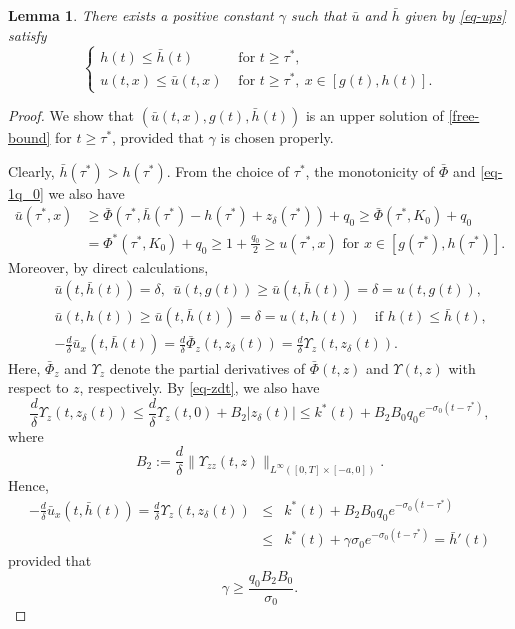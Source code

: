 \documentclass[11pt]{amsart}
\newtheorem{lemma}[theorem]{Lemma}
\numberwithin{equation}{section}
\begin{document}
\begin{lemma}\label{lemma-upp}
There exists a positive constant $\gamma$ such that $\bar{u}$ and $\bar{h}$  given by \eqref{eq-ups} satisfy
\begin{equation*}
  \begin{cases}
    h(t)\leq \bar{h}(t) &\text{ for }t\geq \tau^*,\\
u(t,x)\leq \bar{u}(t,x) &\text{ for }t\geq\tau^*, ~x\in[g(t),h(t)].
  \end{cases}
\end{equation*}
\end{lemma}
\begin{proof}  We  show that $(\bar{u}(t,x),g(t),\bar{h}(t))$ is an upper solution of \eqref{free-bound} for $t\geq \tau^*$, provided that $\gamma$ is chosen properly.  

  Clearly,  $\bar{h}(\tau^*)>h(\tau^*)$. From the choice of $\tau^*$, the monotonicity of $\bar{\Phi}$ and \eqref{eq-1q_0} we also have 
\begin{align*}
  \bar{u}(\tau^*,x)&\geq  \bar{\Phi}(\tau^*, \bar{h}(\tau^*)-h(\tau^*)+z_\delta(\tau^*))+q_0\geq  \bar{\Phi}(\tau^*, K_0)+q_0\\
 & =\Phi^*(\tau^*, K_0)+q_0\geq 1+\frac{q_0}{2}\geq u(\tau^*,x) \text{ for }x\in[g(\tau^*),h(\tau^*)].
\end{align*}
Moreover,  by direct calculations,
\begin{eqnarray}\label{eq-sum}
  &&\bar{u}(t,\bar{h}(t))=\delta, ~~\bar{u}(t,g(t))\geq \bar{u}(t,\bar{h}(t))=\delta=u(t,g(t)),\nonumber\\
  &&\bar{u}(t,h(t))\geq   \bar{u}(t,\bar{h}(t))=\delta=u(t,h(t)) ~~~\text{ if }h(t)\leq \bar{h}(t),\\
  &&-\frac{d}{\delta}\bar{u}_x(t,\bar{h}(t))=\frac{d}{\delta} \bar{\Phi}_z(t,z_\delta(t))=\frac{d}{\delta} \Upsilon_z(t,z_\delta(t))\nonumber.
\end{eqnarray}
Here, $\bar{\Phi}_z$ and $\Upsilon_z$  denote the partial derivatives of $\bar{\Phi}(t,z) $ and $\Upsilon(t,z)$ with respect to $z$, respectively.
By \eqref{eq-zdt}, we also have 
 \begin{equation*}
   \frac{d}{\delta} \Upsilon_z(t,z_\delta(t))\leq \frac{d}{\delta} \Upsilon_z(t,0)+B_2|z_\delta(t)|\leq k^*(t)+B_2B_0q_0 e^{-\sigma_0(t-\tau^*)},
 \end{equation*}
 where 
 \begin{equation*}
  B_2:=\frac{d}{\delta}\|\Upsilon_{zz}(t,z)\|_{L^{\infty}([0,T]\times[-a,0])}.
 \end{equation*}
 Hence, 
 \begin{eqnarray*}
  -\frac{d}{\delta}\bar{u}_x(t,\bar{h}(t))=\frac{d}{\delta}\Upsilon_z(t,z_\delta(t))&\leq &  k^*(t)+B_2B_0q_0 e^{-\sigma_0(t-\tau^*)}\\
&\leq & k^*(t)+\gamma\sigma_0e^{-\sigma_0(t-\tau^{*})}= \bar{h}'(t)
 \end{eqnarray*}
 provided that 
 \begin{equation}\label{eq-gq1}
  \gamma\geq \frac{q_0 B_2B_0 }{\sigma_0}.
 \end{equation}



\end{proof}
\end{document}
